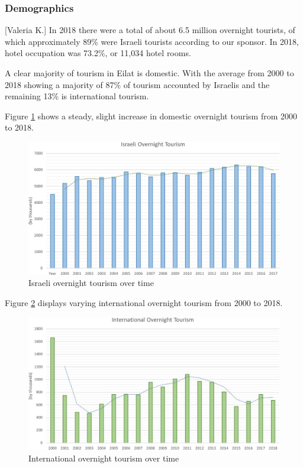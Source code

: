 \documentclass[12pt]{article}                               %
\begin{document}
\subsubsection{Demographics}[Valeria K.]
In 2018 there were a total of about 6.5 million overnight tourists, of which approximately 89\% were Israeli tourists according to our sponsor. In 2018, hotel occupation was 73.2\%, or 11,034 hotel rooms.

A clear majority of tourism in Eilat is domestic. With the average from 2000 to 2018 showing a majority of 87\% of tourism accounted by Israelis and the remaining 13\% is international tourism. 

Figure \ref{img:israeli_overnight_tourism} shows a steady, slight increase in domestic overnight tourism from 2000 to 2018.
\begin{figure}[H]
    \centering
    \includegraphics[width=1\columnwidth]{images/israeli_overnight_tourism.jpg}
    \caption{Israeli overnight tourism over time}
    \label{img:israeli_overnight_tourism}
\end{figure}

Figure \ref{img:international_overnight_tourism} displays varying international overnight tourism from 2000 to 2018.
\begin{figure}[H]
    \centering
    \includegraphics[width=1\columnwidth]{images/international_overnight_tourism.jpeg}
    \caption{International overnight tourism over time}
    \label{img:international_overnight_tourism}
\end{figure}
\end{document}
